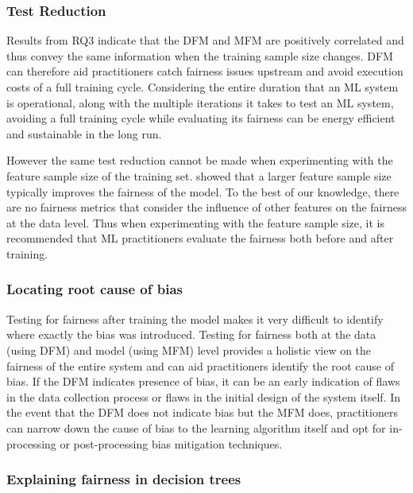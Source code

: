\documentclass[sigconf,review,anonymous]{acmart}
\begin{document}
\subsubsection{Test Reduction}\label{sec:discuss-test-red}

Results from RQ3 indicate that the DFM and MFM are positively
correlated and thus convey the same information when the training
sample size changes. DFM can therefore aid practitioners catch
fairness issues upstream and avoid execution costs of a full training
cycle. Considering the entire duration that an ML system is
operational, along with the multiple iterations it takes to test an ML
system, avoiding a full training cycle while evaluating its fairness
can be energy efficient and sustainable in the long run.

However the same test reduction cannot be made when experimenting with
the feature sample size of the training
set. \citet{zhang2021ignorance} showed that a larger feature sample
size typically improves the fairness of the model. To the best of our
knowledge, there are no fairness metrics that consider the influence
of other features on the fairness at the data level. Thus when
experimenting with the feature sample size, it is recommended that ML
practitioners evaluate the fairness both before and after training.

\subsubsection{Locating root cause of bias}\label{sec:discuss-root-cause-bias}

Testing for fairness after training the model makes it very difficult
to identify where exactly the bias was introduced. Testing for
fairness both at the data (using DFM) and model (using MFM) level
provides a holistic view on the fairness of the entire system and can
aid practitioners identify the root cause of bias. If the DFM
indicates presence of bias, it can be an early indication of flaws in
the data collection process or flaws in the initial design of the
system itself. In the event that the DFM does not indicate bias but
the MFM does, practitioners can narrow down the cause of bias to the
learning algorithm itself and opt for in-processing or post-processing
bias mitigation techniques.

\subsubsection{Explaining fairness in decision trees}\label{sec:discuss-explain-fair-dt}
\end{document}
